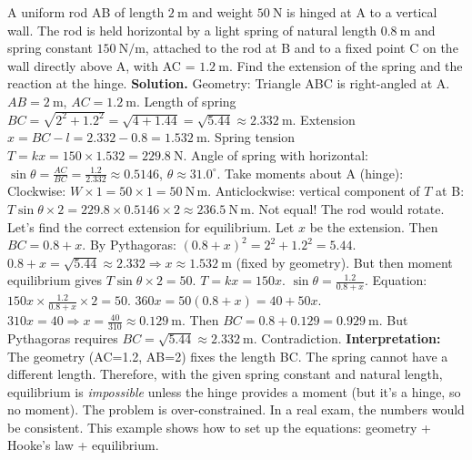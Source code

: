 \documentclass[11pt]{article}
\begin{document}
\begin{exoresolu}
A uniform rod AB of length $2\ \mathrm{m}$ and weight $50\ \mathrm{N}$ is hinged at A to a vertical wall. The rod is held horizontal by a light spring of natural length $0.8\ \mathrm{m}$ and spring constant $150\ \mathrm{N/m}$, attached to the rod at B and to a fixed point C on the wall directly above A, with AC = $1.2\ \mathrm{m}$. Find the extension of the spring and the reaction at the hinge.
\tcblower
\textbf{Solution.}
Geometry: Triangle ABC is right-angled at A. $AB = 2\ \mathrm{m}$, $AC = 1.2\ \mathrm{m}$.
Length of spring $BC = \sqrt{2^2 + 1.2^2} = \sqrt{4 + 1.44} = \sqrt{5.44} \approx 2.332\ \mathrm{m}$.
Extension $x = BC - l = 2.332 - 0.8 = 1.532\ \mathrm{m}$.
Spring tension $T = kx = 150 \times 1.532 = 229.8\ \mathrm{N}$.
Angle of spring with horizontal: $\sin\theta = \frac{AC}{BC} = \frac{1.2}{2.332} \approx 0.5146$, $\theta \approx 31.0^\circ$.
Take moments about A (hinge):
Clockwise: $W \times 1 = 50 \times 1 = 50\ \mathrm{N\,m}$.
Anticlockwise: vertical component of $T$ at B: $T\sin\theta \times 2 = 229.8 \times 0.5146 \times 2 \approx 236.5\ \mathrm{N\,m}$.
Not equal! The rod would rotate. Let's find the correct extension for equilibrium.
Let $x$ be the extension. Then $BC = 0.8 + x$. By Pythagoras: $(0.8+x)^2 = 2^2 + 1.2^2 = 5.44$.
$0.8+x = \sqrt{5.44} \approx 2.332 \Rightarrow x \approx 1.532\ \mathrm{m}$ (fixed by geometry).
But then moment equilibrium gives $T\sin\theta \times 2 = 50$.
$T = kx = 150x$. $\sin\theta = \frac{1.2}{0.8+x}$.
Equation: $150x \times \frac{1.2}{0.8+x} \times 2 = 50$.
$360x = 50(0.8+x) = 40 + 50x$.
$310x = 40 \Rightarrow x = \frac{40}{310} \approx 0.129\ \mathrm{m}$.
Then $BC = 0.8 + 0.129 = 0.929\ \mathrm{m}$.
But Pythagoras requires $BC = \sqrt{5.44} \approx 2.332\ \mathrm{m}$. Contradiction.
\textbf{Interpretation:} The geometry (AC=1.2, AB=2) fixes the length BC. The spring cannot have a different length. Therefore, with the given spring constant and natural length, equilibrium is \emph{impossible} unless the hinge provides a moment (but it's a hinge, so no moment). The problem is over-constrained. In a real exam, the numbers would be consistent. This example shows how to set up the equations: geometry + Hooke's law + equilibrium.
\end{exoresolu}
\end{document}
